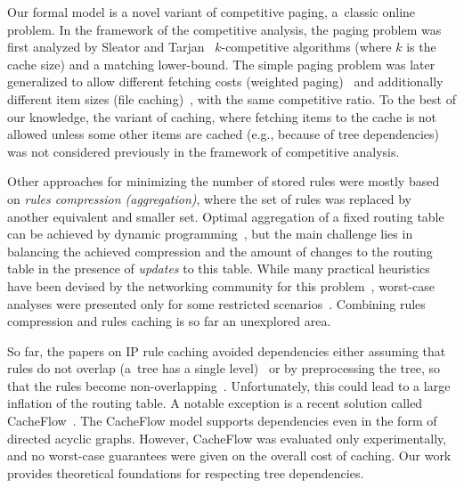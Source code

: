 Our formal model is a novel variant of competitive paging, a~classic online
problem. In the framework of the competitive analysis, the paging problem was
first analyzed  by Sleator and Tarjan~\cite{competitive-analysis} $k$-competitive algorithms (where $k$ is the cache size) and a matching lower-bound.
The simple paging problem was later generalized to allow different fetching
costs (weighted paging)~\cite{double-coverage,young-paging-greedy-dual} and
additionally different item sizes (file caching)~\cite{young-paging-landlord},
with the same competitive ratio.
To the best of our knowledge, the variant of caching, where fetching items to
the cache is not allowed unless some other items are cached (e.g., because of 
tree dependencies) was 
not considered previously in the framework of competitive analysis.

Other approaches for minimizing the number of stored rules were mostly based
on \emph{rules compression (aggregation)}, where the set of rules was replaced
by another equivalent and smaller set. Optimal aggregation of a fixed routing
table can be achieved by dynamic
programming~\cite{ortc,fib-compression-two-dimensional}, but the main
challenge lies in balancing the achieved compression and the amount of changes
to the routing table in the presence of \emph{updates} to this table. While
many practical heuristics have been devised by the networking community for
this problem~\cite{mms,fib-compression-fifa,fib-compression-globecom10,fib-compression-infocom13,fib-sigcomm,fib-compression-smalta,fib-compression-infocom10},
worst-case analyses were presented only for some restricted
scenarios~\cite{fib-icdcs,fib-sirocco}. Combining rules compression and rules
caching is so far an unexplored area.


So far, the papers on IP rule caching avoided dependencies either assuming
that rules do not overlap (a~tree has a single level)~\cite{route-caching-flat} 
or by preprocessing the tree, so that the rules become
non-overlapping~\cite{prefix-caching,fib-caching-non-overlapping}.
Unfortunately, this could lead to a large inflation of the routing table. A
notable exception is a recent solution called CacheFlow~\cite{cacheflow}. The
CacheFlow model supports dependencies even in the form of directed acyclic
graphs. However, CacheFlow was evaluated only experimentally, and no
worst-case guarantees were given on the overall cost of caching. Our work
provides theoretical foundations for respecting tree dependencies.



